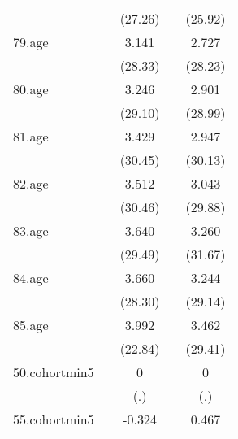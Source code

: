 {\begin{tabular}{l*{4}{c}}
            &                     &     (27.26)         &                     &     (25.92)         \\
[1em]
79.age      &                     &       3.141\sym{***}&                     &       2.727\sym{***}\\
            &                     &     (28.33)         &                     &     (28.23)         \\
[1em]
80.age      &                     &       3.246\sym{***}&                     &       2.901\sym{***}\\
            &                     &     (29.10)         &                     &     (28.99)         \\
[1em]
81.age      &                     &       3.429\sym{***}&                     &       2.947\sym{***}\\
            &                     &     (30.45)         &                     &     (30.13)         \\
[1em]
82.age      &                     &       3.512\sym{***}&                     &       3.043\sym{***}\\
            &                     &     (30.46)         &                     &     (29.88)         \\
[1em]
83.age      &                     &       3.640\sym{***}&                     &       3.260\sym{***}\\
            &                     &     (29.49)         &                     &     (31.67)         \\
[1em]
84.age      &                     &       3.660\sym{***}&                     &       3.244\sym{***}\\
            &                     &     (28.30)         &                     &     (29.14)         \\
[1em]
85.age      &                     &       3.992\sym{***}&                     &       3.462\sym{***}\\
            &                     &     (22.84)         &                     &     (29.41)         \\
[1em]
50.cohortmin5&                     &           0         &                     &           0         \\
            &                     &         (.)         &                     &         (.)         \\
[1em]
55.cohortmin5&                     &      -0.324         &                     &       0.467         \\

\end{tabular}}
